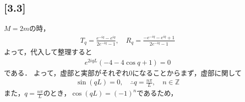 \documentclass[12pt,dvipdfmx]{jsarticle}
\begin{document}
\subsection*{\large{[3.3]}}
$M=2m$の時，
\begin{eqnarray}
  T_q = \frac{e^{-iq}-e^{iq}}{2e^{-iq}-1},\quad R_q = \frac{-e^{-iq}-e^{iq}+1}{2e^{-iq}-1}
\end{eqnarray}
よって，代入して整理すると
\begin{eqnarray}
  e^{2iqL}\left( -4 -4 \cos q +1 \right)=0
\end{eqnarray}
である．
よって，虚部と実部がそれぞれ$0$になることからまず，虚部に関して
\begin{eqnarray}
  \sin(qL)=0,\quad\therefore q = \frac{n\pi}{L},\quad n\in\mathbb{Z}
\end{eqnarray}
また，$q = \frac{n\pi}{L}$のとき，$\cos(qL)= (-1)^{n}$であるため，
\end{document}
